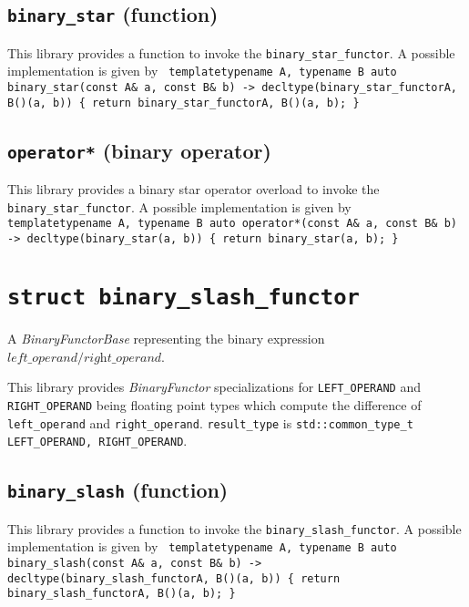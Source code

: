 \documentclass[oneside]{book}
\begin{document}
\subsection{\texttt{binary\_star} (function)}
This library provides a function to invoke the \texttt{binary\_star\_functor}.
A possible implementation is given by\newline
\texttt{
template\textlangle typename A, typename B\textrangle\newline
auto binary\_star(const A\& a, const B\& b) -> decltype(binary\_star\_functor\textlangle A, B\textrangle()(a, b))\newline
\{ return binary\_star\_functor\textlangle A, B\textrangle()(a, b); \}
}

\subsection{\texttt{operator*} (binary operator)}
This library provides a binary star operator overload to invoke the \texttt{binary\_star\_functor}.
A possible implementation is given by\newline
\texttt{
template\textlangle typename A, typename B\textrangle\newline
auto operator*(const A\& a, const B\& b) -> decltype(binary\_star(a, b))\newline
\{ return binary\_star(a, b); \}
}

\section{\texttt{struct binary\_slash\_functor}}
A \textit{BinaryFunctorBase} representing the binary expression $\textit{left\_operand} / \textit{right\_operand}$.\newline

\noindent{}This library provides \textit{BinaryFunctor}         specializations for
\texttt{LEFT\_OPERAND} and   \texttt{RIGHT\_OPERAND} being     floating point types
which compute the difference of \texttt{left\_operand} and \texttt{right\_operand}.
\texttt{result\_type} is \texttt{std::common\_type\_t  \textlangle   LEFT\_OPERAND,
RIGHT\_OPERAND\textrangle}.

\subsection{\texttt{binary\_slash} (function)}
This library provides a function to invoke the \texttt{binary\_slash\_functor}.
A possible implementation is given by\newline
\texttt{
template\textlangle typename A, typename B\textrangle\newline
auto binary\_slash(const A\& a, const B\& b) -> decltype(binary\_slash\_functor\textlangle A, B\textrangle()(a, b))\newline
\{ return binary\_slash\_functor\textlangle A, B\textrangle()(a, b); \}
}
\end{document}
